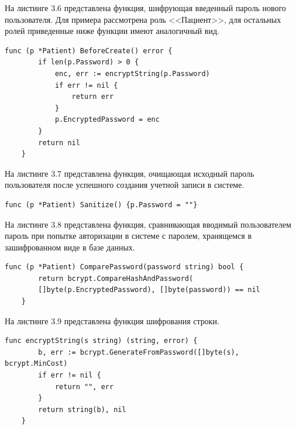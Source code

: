 \clearpage

На листинге 3.6 представлена функция, шифрующая введенный пароль нового пользователя. Для примера рассмотрена роль <<Пациент>>, для остальных ролей приведенные ниже функции имеют аналогичный вид.

\begin{lstlisting}[caption={Функция, шифрующая пароль}]
	func (p *Patient) BeforeCreate() error {
		if len(p.Password) > 0 {
			enc, err := encryptString(p.Password)
			if err != nil {
				return err
			}
			p.EncryptedPassword = enc
		}
		return nil
	}
\end{lstlisting}

На листинге 3.7 представлена функция, очищающая исходный пароль пользователя после успешного создания учетной записи в системе.

\begin{lstlisting}[caption={Функция, очищающая исходный пароль}]
	func (p *Patient) Sanitize() {p.Password = ""}
\end{lstlisting}

На листинге 3.8 представлена функция, сравнивающая вводимый пользователем пароль при попытке авторизации в системе с паролем, хранящемся в зашифрованном виде в базе данных.

\begin{lstlisting}[caption={Функция, сравнивающая пароли}]
	func (p *Patient) ComparePassword(password string) bool {
		return bcrypt.CompareHashAndPassword(
		[]byte(p.EncryptedPassword), []byte(password)) == nil
	}
\end{lstlisting}

На листинге 3.9 представлена функция шифрования строки.

\begin{lstlisting}[caption={Функция шифрования строки}]
	func encryptString(s string) (string, error) {
		b, err := bcrypt.GenerateFromPassword([]byte(s), bcrypt.MinCost)
		if err != nil {
			return "", err
		}
		return string(b), nil
	}
\end{lstlisting}

